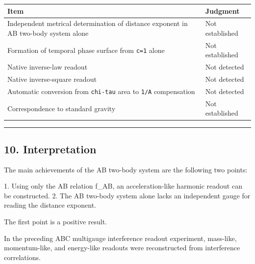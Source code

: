 \documentclass[
]{article}
\newenvironment{Shaded}{}{}
\newcommand{\NormalTok}[1]{#1}
\newcounter{none} %
\begin{document}
{\def\LTcaptype{none} %
\begin{longtable}[]{@{}
  >{\raggedright\arraybackslash}p{}
  >{\raggedright\arraybackslash}p{}@{}}
\toprule\noalign{}
\begin{minipage}[b]{\linewidth}\raggedright
Item
\end{minipage} & \begin{minipage}[b]{\linewidth}\raggedright
Judgment
\end{minipage} \\
\midrule\noalign{}
\endhead
\bottomrule\noalign{}
\endlastfoot
Independent metrical determination of distance exponent in AB two-body
system alone & Not established \\
Formation of temporal phase surface from \texttt{c=1} alone & Not
established \\
Native inverse-law readout & Not detected \\
Native inverse-square readout & Not detected \\
Automatic conversion from \texttt{chi-tau} area to \texttt{1/A}
compensation & Not detected \\
Correspondence to standard gravity & Not established \\
\end{longtable}
}

\begin{center}\rule{0.5\linewidth}{0.5pt}\end{center}

\subsection{10. Interpretation}\label{interpretation}

The main achievements of the AB two-body system are the following two
points:

\begin{Shaded}
\begin{Highlighting}[]
\NormalTok{1. Using only the AB relation f\_AB, an acceleration{-}like harmonic readout can be constructed.}
\NormalTok{2. The AB two{-}body system alone lacks an independent gauge for reading the distance exponent.}
\end{Highlighting}
\end{Shaded}

The first point is a positive result.

In the preceding ABC multigauge interference readout experiment,
mass-like, momentum-like, and energy-like readouts were reconstructed
from interference correlations.
\end{document}
